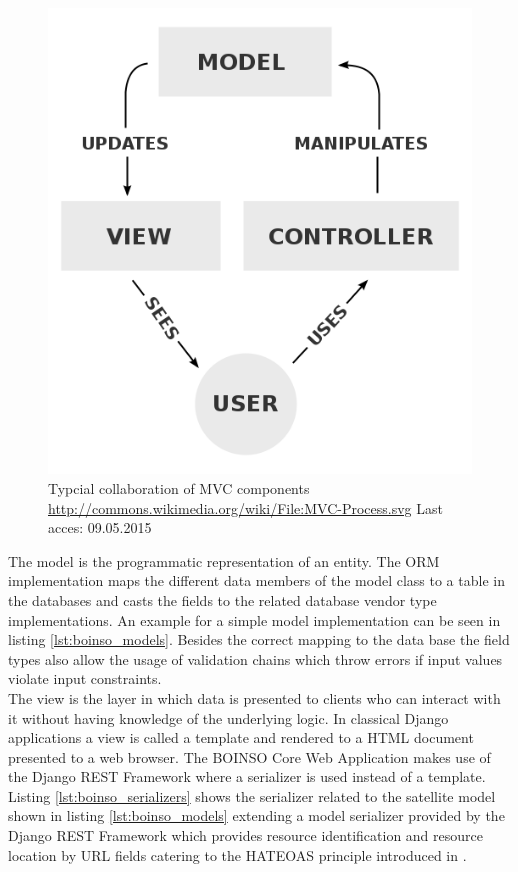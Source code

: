 \documentclass[BachelorPaper]{subfiles}
\begin{document}
\clearpage

\begin{figure}[!htbp]
\centering
\includegraphics[width=0.5\linewidth]{PICs/BacPics/MVC-Process.png}
\caption{Typcial collaboration of MVC components \url{http://commons.wikimedia.org/wiki/File:MVC-Process.svg} Last acces: 09.05.2015}\label{fig:MVC}
\end{figure}



The model is the programmatic representation of an entity. The \ac{ORM} implementation maps the different data members of the model class to a table in the databases and casts the fields to the related database vendor type implementations. An example for a simple model implementation can be seen in listing \ref{lst:boinso_models}. Besides the correct mapping to the data base the field types also allow the usage of validation chains which throw errors if input values violate input constraints.\\

The view is the layer in which data is presented to clients who can interact with it without having knowledge of the underlying logic. In classical Django applications a view is called a template and rendered to a \ac{HTML} document presented to a web browser. The BOINSO Core Web Application makes use of the Django \ac{REST} Framework where a serializer is used instead of a template. Listing \ref{lst:boinso_serializers} shows the serializer related to the satellite model shown in listing \ref{lst:boinso_models} extending a model serializer provided by the Django \ac{REST} Framework which provides resource identification and resource location by \ac{URL} fields catering to the \ac{HATEOAS} principle introduced in \cite{Fielding_2000}.\\
\end{document}
